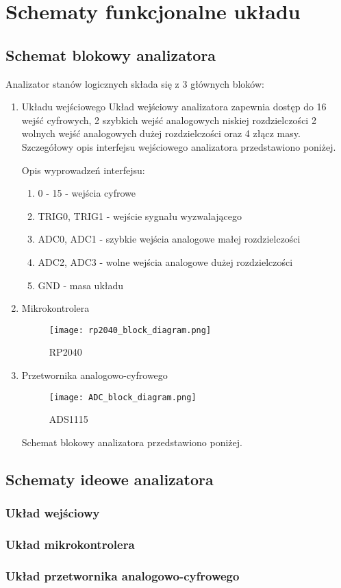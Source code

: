\section{Schematy funkcjonalne układu}

\subsection{Schemat blokowy analizatora}
Analizator stanów logicznych składa się z 3 głównych bloków:
\begin{enumerate}
    \item Układu wejściowego
Układ wejściowy analizatora zapewnia dostęp do 16 wejść cyfrowych,
2 szybkich wejść analogowych niskiej rozdzielczości 2 wolnych wejść
analogowych dużej rozdzielczości oraz 4 złącz masy. Szczegółowy opis 
interfejsu wejściowego analizatora przedstawiono poniżej.


Opis wyprowadzeń interfejsu:
\begin{enumerate}
    \item 0 - 15 - wejścia cyfrowe
    \item TRIG0, TRIG1 - wejście sygnału wyzwalającego
    \item ADC0, ADC1 - szybkie wejścia analogowe małej rozdzielczości
    \item ADC2, ADC3 - wolne wejścia analogowe dużej rozdzielczości
    \item GND - masa układu 
\end{enumerate} 

    \item Mikrokontrolera
    \begin{figure}[!ht]
        \centering
        \texttt{[image: rp2040\_block\_diagram.png]}
        \caption{RP2040}
        \label{fig:RP2040}
    \end{figure}

    \item Przetwornika analogowo-cyfrowego 
    \begin{figure}[!ht]
        \centering
        \texttt{[image: ADC\_block\_diagram.png]}
        \caption{ADS1115}
        \label{fig:ADS1115}
    \end{figure}

Schemat blokowy analizatora przedstawiono poniżej.

\end{enumerate}



\subsection{Schematy ideowe analizatora}
\subsubsection{Układ wejściowy}
\subsubsection{Układ mikrokontrolera}
\subsubsection{Układ przetwornika analogowo-cyfrowego}






